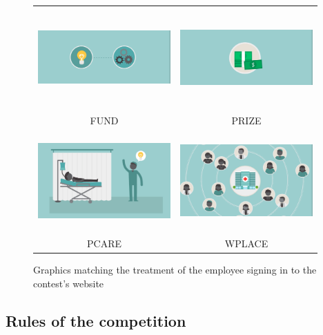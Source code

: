 \documentclass[11pt, titlepage]{article}
\begin{document}
\begin{figure}
\centering
\caption{Graphics matching the treatment of the employee signing in to the contest's website}
\label{app: graphics}
\begin{tabular}{cc}
\includegraphics[width=2in, height=1.5in]{Images/priming/funding.png} & 
\includegraphics[width=2in, height=1.5in]{Images/priming/money.png} \\
FUND & PRIZE \\
\includegraphics[width=2in, height=1.5in]{Images/priming/patientcare.png} & 
\includegraphics[width=2in, height=1.5in]{Images/priming/workplace.png} \\
PCARE & WPLACE
\end{tabular}
\end{figure}

\clearpage

\subsection{Rules of the competition}\label{rules-of-the-competition}
\end{document}
